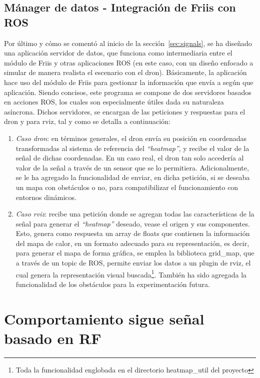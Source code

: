 \subsection{Mánager de datos - Integración de Friis con \ac{ROS}}
\label{subsec:friis-ros}

Por último y cómo se comentó al inicio de la sección~\ref{sec:signals}, se ha diseñado una aplicación servidor de datos, que funciona como intermediaria entre el módulo de Friis y otras aplicaciones \ac{ROS} (en este caso, con un diseño enfocado a simular de manera realista el escenario con el dron). Básicamente, la aplicación hace uso del módulo de Friis para gestionar la información que envía a según que aplicación. Siendo concisos, este programa se compone de dos servidores basados en acciones \ac{ROS}, los cuales son especialmente útiles dada su naturaleza asíncrona. Dichos servidores, se encargan de las peticiones y respuestas para el dron y para rviz, tal y como se detalla a continuación:

\begin{enumerate}
	\item \emph{Caso dron}: en términos generales, el dron envía su posición en coordenadas transformadas al sistema de referencia del \emph{``heatmap''}, y recibe el valor de la señal de dichas coordenadas. En un caso real, el dron tan solo accedería al valor de la señal a través de un sensor que se lo permitiera. Adicionalmente, se le ha agregado la funcionalidad de enviar, en dicha petición, si se deseaba un mapa con obstáculos o no, para compatibilizar el funcionamiento con entornos dinámicos.

	\item \emph{Caso rviz}: recibe una petición donde se agregan todas las características de la señal para generar el \emph{``heatmap''} deseado, vease el origen y sus componentes. Esto, genera como respuesta un array de floats que contienen la información del mapa de calor, en un formato adecuado para su representación, es decir, para generar el mapa de forma gráfica, se emplea la biblioteca grid\_map, que a través de un topic de \ac{ROS}, permite enviar los datos a un plugin de rviz, el cual genera la representación visual buscada\footnote[3]{Toda la funcionalidad englobada en el directorio heatmap\_util del proyecto}. También ha sido agregada la funcionalidad de los obstáculos para la experimentación futura.
\end{enumerate}

\section{Comportamiento sigue señal basado en \ac{RF}}
\label{sec:signal_follow}

